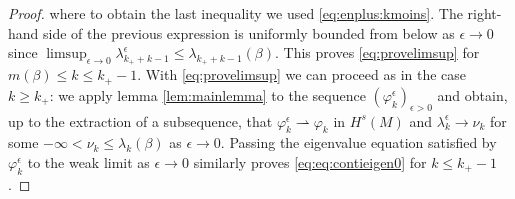 \documentclass[10pt]{amsart}
\numberwithin{equation}{section}
\def\ep{{\varepsilon}}
\newcommand{\vp}{\varphi}
\def \ep{\epsilon}
\theoremstyle{plain}
\theoremstyle{remark}
\begin{document}
\begin{proof}
where to obtain the last inequality we used \eqref{eq:enplus:kmoins}. The right-hand side of the previous expression is uniformly bounded from below as $\ep \to 0$ since $\limsup_{\ep\to 0} \lambda_{k_++k-1}^\ep \leq \lambda_{k_++k-1}(\beta)$. This proves  \eqref{eq:provelimsup} for $m(\beta) \leq k\leq k_+-1$. With  \eqref{eq:provelimsup} we can proceed as in the case $k\geq k_+$: we apply lemma \ref{lem:mainlemma} to the sequence $(\vp_k^\ep)_{\ep >0}$ and obtain, up to the extraction of a subsequence, that $\vp_k^\ep \rightharpoonup \vp_k$ in $H^s(M)$  and $\lambda_k^\ep \to \nu_k$ for some $-\infty < \nu_k \le \lambda_k(\beta)$ as $\ep \to 0$. Passing the eigenvalue equation satisfied by $\vp_k^{\ep}$ to the weak limit as $\ep \to 0$ similarly proves \eqref{eq:eq:contieigen0} for $k \leq k_+-1$. %

\smallskip


\end{proof}
\end{document}
